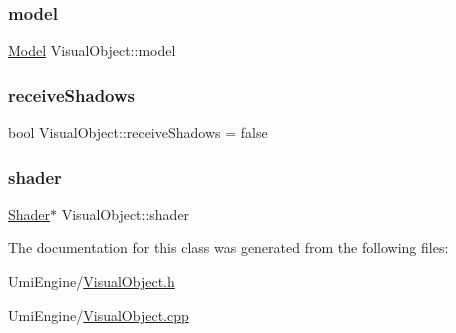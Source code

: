 \subsubsection{\texorpdfstring{model}{model}}
{\footnotesize\ttfamily \mbox{\hyperlink{class_model}{Model}} Visual\+Object\+::model}

\mbox{\label{class_visual_object_af54b3c823b3ca24736faeedc88ef90f3}} 
\subsubsection{\texorpdfstring{receiveShadows}{receiveShadows}}
{\footnotesize\ttfamily bool Visual\+Object\+::receive\+Shadows = false}

\mbox{\label{class_visual_object_a6d00e06796983b19f57d6fd86b202902}} 
\subsubsection{\texorpdfstring{shader}{shader}}
{\footnotesize\ttfamily \mbox{\hyperlink{class_shader}{Shader}}$\ast$ Visual\+Object\+::shader}



The documentation for this class was generated from the following files\+:\begin{DoxyCompactItemize}
\item 
Umi\+Engine/\mbox{\hyperlink{_visual_object_8h}{Visual\+Object.\+h}}\item 
Umi\+Engine/\mbox{\hyperlink{_visual_object_8cpp}{Visual\+Object.\+cpp}}\end{DoxyCompactItemize}
